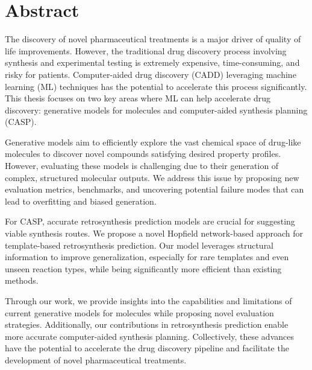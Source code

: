 
{%
\chapter*{Abstract}
The discovery of novel pharmaceutical treatments is a major driver of quality of
life improvements. However, the traditional drug discovery process involving
synthesis and experimental testing is extremely expensive, time-consuming, and
risky for patients. Computer-aided drug discovery (CADD) leveraging machine
learning (ML) techniques has the potential to accelerate this process
significantly. This thesis focuses on two key areas where ML can help accelerate
drug discovery: generative models for molecules and computer-aided synthesis
planning (CASP).

Generative models aim to efficiently explore the vast chemical space of
drug-like molecules to discover novel compounds satisfying desired property
profiles. However, evaluating these models is challenging due to their
generation of complex, structured molecular outputs. We address this issue by
proposing new evaluation metrics, benchmarks, and uncovering potential failure
modes that can lead to overfitting and biased generation.

For CASP, accurate retrosynthesis prediction models are crucial for suggesting
viable synthesis routes. We propose a novel Hopfield network-based approach for
template-based retrosynthesis prediction. Our model leverages structural
information to improve generalization, especially for rare templates and even
unseen reaction types, while being significantly more efficient than existing
methods.

Through our work, we provide insights into the capabilities and limitations of
current generative models for molecules while proposing novel evaluation
strategies. Additionally, our contributions in retrosynthesis prediction enable
more accurate computer-aided synthesis planning. Collectively, these advances
have the potential to accelerate the drug discovery pipeline and facilitate the
development of novel pharmaceutical treatments.

}
